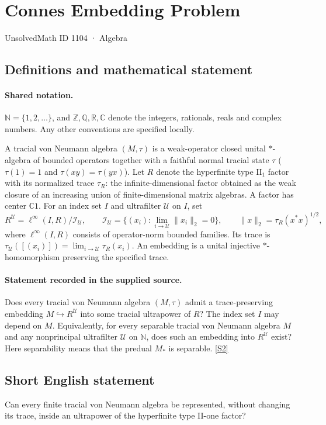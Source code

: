 \documentclass[11pt]{article}
\newcommand{\sref}[2]{\hyperlink{source:#1:#2}{[S#2]}}
\begin{document}
\setcounter{section}{1103}
\section{Connes Embedding Problem}\label{1104}
{\small\sffamily UnsolvedMath ID 1104 · Algebra}
\subsection{Definitions and mathematical statement}

\paragraph{Shared notation.}$\mathbb N=\{1,2,\ldots\}$, and $\mathbb Z,\mathbb Q,\mathbb R,\mathbb C$ denote the integers, rationals, reals and complex numbers. Any other conventions are specified locally.


A tracial von Neumann algebra $(M,\tau)$ is a weak-operator closed unital $*$-algebra of bounded operators together with a faithful normal tracial state $\tau$ ($\tau(1)=1$ and $\tau(xy)=\tau(yx)$). Let $R$ denote the hyperfinite type $\mathrm{II}_1$ factor with its normalized trace $\tau_R$: the infinite-dimensional factor obtained as the weak closure of an increasing union of finite-dimensional matrix algebras. A factor has center $\mathbb C1$. For an index set $I$ and ultrafilter $\mathcal U$ on $I$, set
\[
 R^{\mathcal U}=\ell^\infty(I,R)/\mathcal I_{\mathcal U},\qquad
 \mathcal I_{\mathcal U}=\{(x_i):\lim_{i\to\mathcal U}\|x_i\|_2=0\},
 \qquad\|x\|_2=\tau_R(x^*x)^{1/2},
\]
where $\ell^\infty(I,R)$ consists of operator-norm bounded families. Its trace is $\tau_{\mathcal U}([(x_i)])=\lim_{i\to\mathcal U}\tau_R(x_i)$. An embedding is a unital injective $*$-homomorphism preserving the specified trace.
\paragraph{Statement recorded in the supplied source.}
Does every tracial von Neumann algebra $(M,\tau)$ admit a trace-preserving embedding $M\hookrightarrow R^{\mathcal U}$ into some tracial ultrapower of $R$? The index set $I$ may depend on $M$. Equivalently, for every separable tracial von Neumann algebra $M$ and any nonprincipal ultrafilter $\mathcal U$ on $\mathbb N$, does such an embedding into $R^{\mathcal U}$ exist? Here separability means that the predual $M_*$ is separable. \sref{1104}{2}
\subsection{Short English statement}
Can every finite tracial von Neumann algebra be represented, without changing its trace, inside an ultrapower of the hyperfinite type II-one factor?
\end{document}
